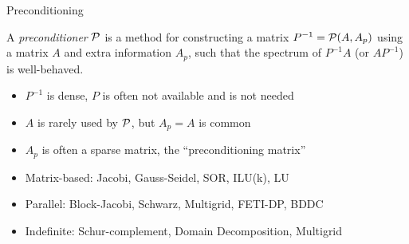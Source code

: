 \begin{frame}{Preconditioning}
  \begin{definition}[Preconditioner]
      A \emph{preconditioner} $\mathcal{P}$ is a method for constructing a matrix
      $P^{-1} = \mathcal{P}(A,A_p)$ using a matrix $A$ and extra information $A_p$, such that
      the spectrum of $P^{-1}A$ (or $A P^{-1}$) is well-behaved.
    \end{definition}
    \begin{itemize}
    \item $P^{-1}$ is dense, $P$ is often not available and is not needed
    \item $A$ is rarely used by $\mathcal{P}$, but $A_p = A$ is common
    \item $A_p$ is often a sparse matrix, the ``preconditioning matrix''
    \item Matrix-based: Jacobi, Gauss-Seidel, SOR, ILU(k), LU
    \item Parallel: Block-Jacobi, Schwarz, Multigrid, FETI-DP, BDDC
    \item Indefinite: Schur-complement, Domain Decomposition, Multigrid
    \end{itemize}
\end{frame}
